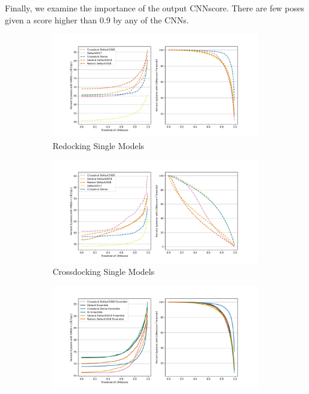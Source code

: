 \documentclass[journal=jcisd8,manuscript=article]{achemso}
\begin{document}
Finally, we examine the importance of the output CNNscore. There are few poses given a score higher than 0.9 by any of the CNNs.
\begin{figure}    
        \begin{subfigure}[b]{0.48\textwidth}    
		\centering
		\includegraphics[width=\textwidth]{figures/redocking/thresh_cnnscore_single_models.png}
		\caption{Redocking Single Models}
		\label{fig:ThreshSingleRD}
        \end{subfigure}    
        \begin{subfigure}[b]{0.48\textwidth}    
		\centering
		\includegraphics[width=\textwidth]{figures/crossdocking/thresh_cnnscore_single_models.png}
		\caption{Crossdocking Single Models}
		\label{fig:ThreshSingleCD}
        \end{subfigure}
        \hfill
        \begin{subfigure}[b]{0.48\textwidth}    
		\centering
		\includegraphics[width=\textwidth]{figures/redocking/thresh_cnnscore_ensembles.png}

\end{subfigure}
\end{figure}
\end{document}
